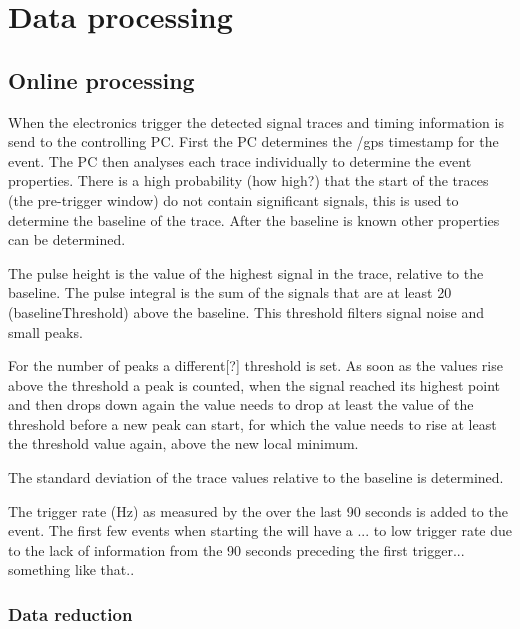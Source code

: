 \chapter{Data processing}
\label{ch:data_processing}

\section{Online processing}

When the \hisparc electronics trigger the detected signal traces and timing information is send to the controlling PC. First the PC determines the /gps timestamp for the event. The PC then analyses each trace individually to determine the event properties. There is a high probability (how high?) that the start of the traces (the pre-trigger window) do not contain significant signals, this is used to determine the baseline of the trace. After the baseline is known other properties can be determined.

The pulse height is the value of the highest signal in the trace, relative to the baseline. The pulse integral is the sum of the signals that are at least \SI{20}{\adc} (baselineThreshold) above the baseline. This threshold filters signal noise and small peaks.

For the number of peaks a different[?] threshold is set. As soon as the values rise above the threshold a peak is counted, when the signal reached its highest point and then drops down again the value needs to drop at least the value of the threshold before a new peak can start, for which the value needs to rise at least the threshold value again, above the new local minimum.

The standard deviation of the trace values relative to the baseline is determined.

The trigger rate (Hz) as measured by the \daq over the last 90 seconds is added to the event. The first few events when starting the \daq will have a ... to low trigger rate due to the lack of information from the 90 seconds preceding the first trigger... something like that..


\subsection{Data reduction}

